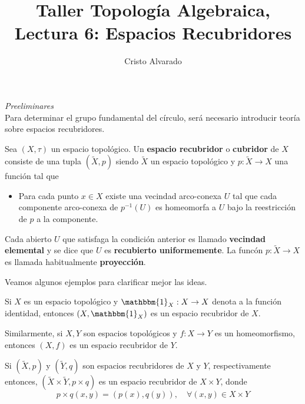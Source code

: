\documentclass{article}
\theoremstyle{largebreak}
\newcommand\subtitle[1]{\textit{\large #1}\\}
\newcommand\cf[3]{\ensuremath{#1:#2\rightarrow#3}}
\newcommand{\bbm}[1]{\ensuremath{\mathbbm{#1}}}
\begin{document}
    \title{Taller Topología Algebraica, Lectura 6: Espacios Recubridores}
    \author{Cristo Alvarado}
    \setcounter{section}{6}
    \maketitle

    \subtitle{Preeliminares}

    Para determinar el grupo fundamental del círculo, será necesario introducir teoría sobre espacios recubridores.
    
    \begin{mydef}
        Sea $(X,\tau)$ un espacio topológico. Un \textbf{espacio recubridor} o \textbf{cubridor} de $X$ consiste de una tupla $(\widetilde{X},p)$ siendo $\widetilde{X}$ un espacio topológico y $\cf{p}{\widetilde{X}}{X}$ una función tal que
        \begin{itemize}
            \item Para cada punto $x\in X$ existe una vecindad arco-conexa $U$ tal que cada componente arco-conexa de $p^{-1}(U)$ es homeomorfa a $U$ bajo la reestricción de $p$ a la componente.
        \end{itemize}
        Cada abierto $U$ que satisfaga la condición anterior es llamado \textbf{vecindad elemental} y se dice que $U$ es \textbf{recubierto uniformemente}. La funcón $\cf{p}{\widetilde{X}}{X}$ es llamada habitualmente \textbf{proyección}.
    \end{mydef}

    Veamos algunos ejemplos para clarificar mejor las ideas.

    \begin{exa}
        Si $X$ es un espacio topológico y $\cf{\bbm{1}_X}{X}{X}$ denota a la función identidad, entonces $(X,\bbm{1}_X)$ es un espacio recubridor de $X$.
        
        Similarmente, si $X,Y$ son espacios topológicos y $\cf{f}{X}{Y}$ es un homeomorfismo, entonces $(X,f)$ es un espacio recubridor de $Y$.
    \end{exa}

    \begin{exa}
        Si $(\widetilde{X},p)$ y $(\widetilde{Y},q)$ son espacios recubridores de $X$ y $Y$, respectivamente entonces, $(\widetilde{X}\times\widetilde{Y},p\times q)$ es un espacio recubridor de $X\times Y$, donde
        \begin{equation*}
            p\times q(x,y)=(p(x),q(y)),\quad\forall (x,y)\in X\times Y
        \end{equation*}
    \end{exa}
\end{document}
